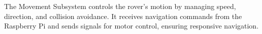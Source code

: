 The Movement Subsystem controls the rover's motion by managing speed, direction, and collision avoidance. It receives navigation commands from the Raspberry Pi and sends signals for motor control, ensuring responsive navigation.







